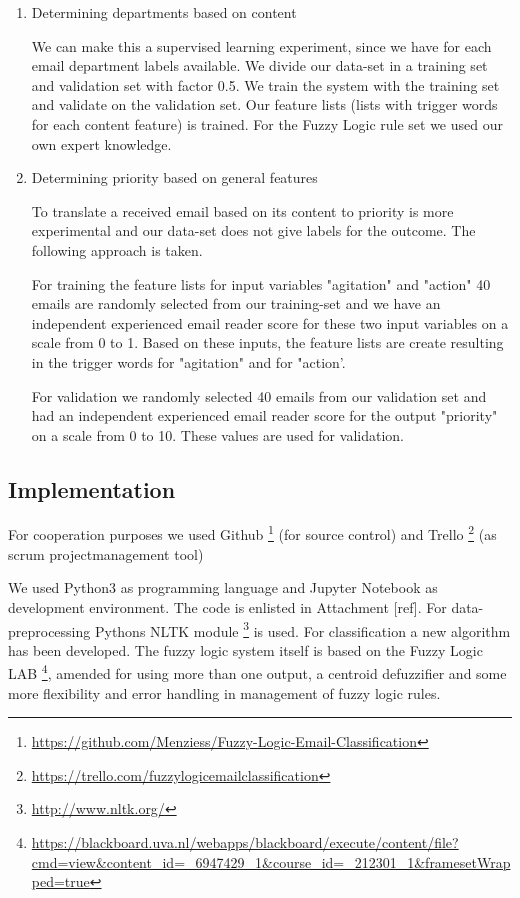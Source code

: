 \documentclass[journal]{IEEEtran}
\begin{document}
\begin{enumerate}
    \item{Determining departments based on content}

    We can make this a supervised learning experiment, since we have for each email department labels available. We divide our data-set in a training set and validation set with factor 0.5. We train the system with the training set and validate on the validation set. Our feature lists (lists with trigger words for each content feature) is trained. For the Fuzzy Logic rule set we used our own expert knowledge.

    \item{Determining priority based on general features}

    To translate a received email based on its content to priority is more experimental and our data-set does not give labels for the outcome. The following approach is taken. 

    For training the feature lists for input variables "agitation" and "action" 40 emails are randomly selected from our training-set and we have an independent experienced email reader score for these two input variables on a scale from 0 to 1. Based on these inputs, the feature lists are create resulting in the trigger words for "agitation" and for "action'. 

    For validation we randomly selected 40 emails from our validation set and had an independent experienced email reader score for the output "priority" on a scale from 0 to 10. These values are used for validation.

\end{enumerate}

\subsection{Implementation}

For cooperation purposes we used Github \footnote{\url{https://github.com/Menziess/Fuzzy-Logic-Email-Classification}} (for source control) and Trello \footnote{\url{https://trello.com/fuzzylogicemailclassification}} (as scrum projectmanagement tool)

We used Python3 as programming language and Jupyter Notebook as development 
environment. The code is enlisted in Attachment [ref]. For data-preprocessing Pythons NLTK module \footnote{\url{http://www.nltk.org/}} is used. For classification a new algorithm has been developed. The fuzzy logic system itself is based on the Fuzzy Logic LAB \footnote{\url{https://blackboard.uva.nl/webapps/blackboard/execute/content/file?cmd=view&content_id=_6947429_1&course_id=_212301_1&framesetWrapped=true}}, amended for using more than one output, a centroid defuzzifier and some more flexibility and error handling in management of fuzzy logic rules. 
\end{document}
